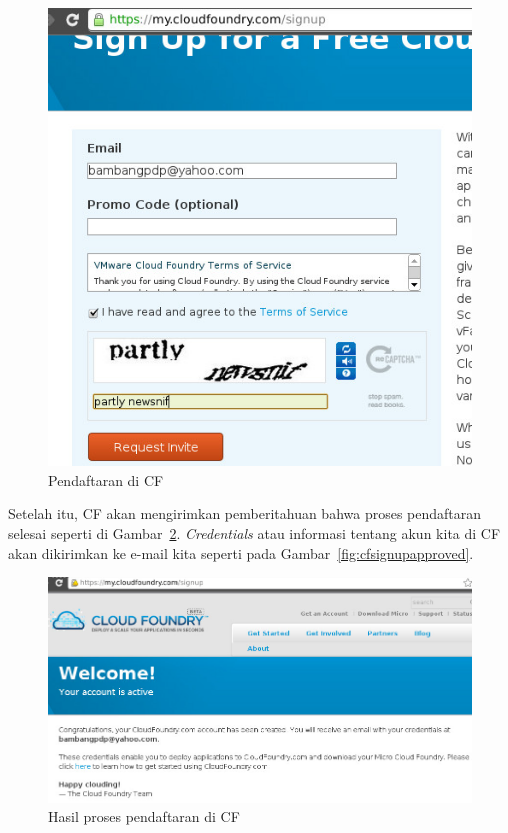 \begin{figure}[t]
    \begin{center}
      \includegraphics[scale=0.5]{images/cf-signup.jpg}
    \end{center}
    \caption{Pendaftaran di CF}
    \label{fig:cfsignup}
  \end{figure}

Setelah itu, CF akan mengirimkan pemberitahuan bahwa proses pendaftaran selesai seperti di Gambar~\ref{fig:cfsignuphasil}. \textit{Credentials} atau informasi tentang akun kita di CF akan dikirimkan ke e-mail kita seperti pada Gambar~\ref{fig:cfsignupapproved}.
 
  \begin{figure}
    \begin{center}
      \includegraphics[scale=0.5]{images/cf-signup-hasil.jpg}
    \end{center}
    \caption{Hasil proses pendaftaran di CF}
    \label{fig:cfsignuphasil}
  \end{figure}

